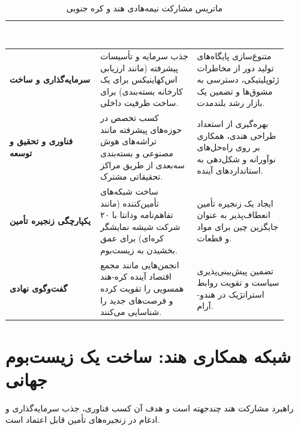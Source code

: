 \documentclass[10pt]{report}
\begin{document}
\begin{table}[H]
    \centering
    \caption{ماتریس مشارکت نیمه‌هادی هند و کره جنوبی}
    \label{tab:india_korea_matrix}
    \begin{tabular}{P{0.3\linewidth} P{0.32\linewidth} P{0.3\linewidth}}
        \toprule
        \textcolor{white}{\textbf{شکل همکاری}} & \textcolor{white}{\textbf{منافع و دستاوردهای هند}} & \textcolor{white}{\textbf{منافع و دستاوردهای کره جنوبی}} \\
        \midrule
        \textbf{سرمایه‌گذاری و ساخت} & جذب سرمایه و تأسیسات پیشرفته (مانند ارزیابی اس‌کهاینیکس برای یک کارخانه بسته‌بندی) برای ساخت ظرفیت داخلی. & متنوع‌سازی پایگاه‌های تولید دور از مخاطرات ژئوپلیتیکی، دسترسی به مشوق‌ها و تضمین یک بازار رشد بلندمدت. \\
        \textbf{فناوری و تحقیق و توسعه} & کسب تخصص در حوزه‌های پیشرفته مانند تراشه‌های هوش مصنوعی و بسته‌بندی سه‌بعدی از طریق مراکز تحقیقاتی مشترک. & بهره‌گیری از استعداد طراحی هندی، همکاری بر روی راه‌حل‌های نوآورانه و شکل‌دهی به استانداردهای آینده. \\
        \textbf{یکپارچگی زنجیره تأمین} & ساخت شبکه‌های تأمین‌کننده (مانند تفاهم‌نامه ودانتا با ۲۰ شرکت شیشه نمایشگر کره‌ای) برای عمق بخشیدن به زیست‌بوم. & ایجاد یک زنجیره تأمین انعطاف‌پذیر به عنوان جایگزین چین برای مواد و قطعات. \\
        \textbf{گفت‌وگوی نهادی} & انجمن‌هایی مانند مجمع اقتصاد آینده کره-هند همسویی را تقویت کرده و فرصت‌های جدید را شناسایی می‌کنند. & تضمین پیش‌بینی‌پذیری سیاست و تقویت روابط استراتژیک در هندو-آرام. \\
        \bottomrule
    \end{tabular}
\end{table}

\section{شبکه همکاری هند: ساخت یک زیست‌بوم جهانی}
راهبرد مشارکت هند چندجهته است و هدف آن کسب فناوری، جذب سرمایه‌گذاری و ادغام در زنجیره‌های تأمین قابل اعتماد است.
\end{document}
